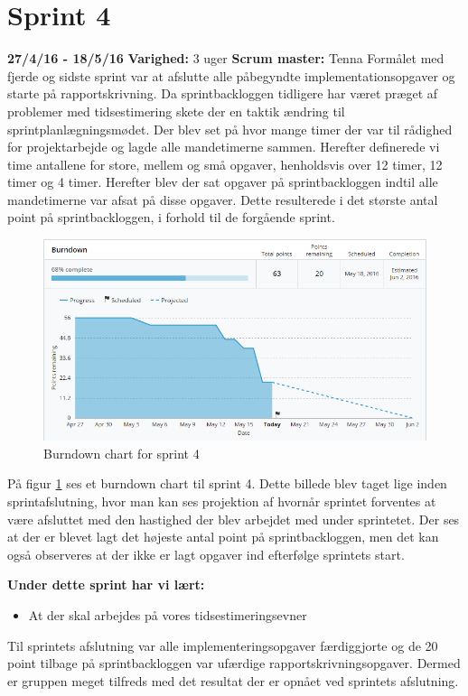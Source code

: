 \documentclass[a4paper,oneside,article]{memoir}
\begin{document}
	\section{Sprint 4}
	\textbf{27/4/16 - 18/5/16}\newline
	\textbf{Varighed: }3 uger \newline
	\textbf{Scrum master: }Tenna \newline \newline
	Formålet med fjerde og sidste sprint var at afslutte alle påbegyndte implementationsopgaver og starte på rapportskrivning. Da sprintbackloggen tidligere har været præget af problemer med tidsestimering skete der en taktik ændring til sprintplanlægningsmødet. Der blev set på hvor mange timer der var til rådighed for projektarbejde og lagde alle mandetimerne sammen. Herefter definerede vi time antallene for store, mellem og små opgaver, henholdsvis over 12 timer, 12 timer og 4 timer. Herefter blev der sat opgaver på sprintbackloggen indtil alle mandetimerne var afsat på disse opgaver. Dette resulterede i det største antal point på sprintbackloggen, i forhold til de forgående sprint.
	
	\begin{figure}[H]
		\centering
		\includegraphics[width=\textwidth]{Projektgennemfoerelse/images/burndown4}
		\caption{Burndown chart for sprint 4}
		\label{ref:Burndown4}
	\end{figure}
	
	På figur \ref{ref:Burndown4} ses et burndown chart til sprint 4. Dette billede blev taget lige inden sprintafslutning, hvor man kan ses projektion af hvornår sprintet forventes at være afsluttet med den hastighed der blev arbejdet med under sprintetet. Der ses at der er blevet lagt det højeste antal point på sprintbackloggen, men det kan også observeres at der ikke er lagt opgaver ind efterfølge sprintets start. \newline
	
	\textbf{Under dette sprint har vi lært:}
	\begin{itemize}
		\item At der skal arbejdes på vores tidsestimeringsevner
	\end{itemize}
	
	Til sprintets afslutning var alle implementeringsopgaver færdiggjorte og de 20 point tilbage på sprintbackloggen var ufærdige rapportskrivningsopgaver. Dermed er gruppen meget tilfreds med det resultat der er opnået ved sprintets afslutning.  
\end{document}
